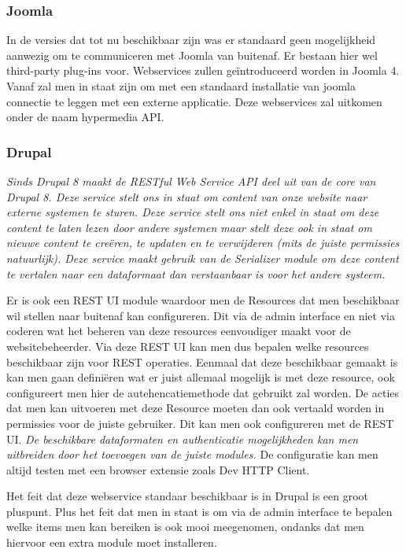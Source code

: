 \subsubsection{Joomla}
In de versies dat tot nu beschikbaar zijn was er standaard geen mogelijkheid aanwezig om te communiceren met Joomla van buitenaf. Er bestaan hier wel third-party plug-ins voor. Webservices zullen geïntroduceerd worden in Joomla 4. Vanaf zal men in staat zijn om met een standaard installatie van joomla connectie te leggen met een externe applicatie. Deze webservices zal uitkomen onder de naam hypermedia API.
\subsubsection{Drupal}
\textit{Sinds Drupal 8 maakt de RESTful Web Service API deel uit van de core van Drupal 8. Deze service stelt ons in staat om content van onze website naar externe systemen te sturen. Deze service stelt ons niet enkel in staat om deze content te laten lezen door andere systemen maar stelt deze ook in staat om nieuwe content te creëren, te updaten en te verwijderen (mits de juiste permissies natuurlijk). Deze service maakt gebruik van de Serializer module om deze content te vertalen naar een dataformaat dan verstaanbaar is voor het andere systeem.}\autocite{DrupalCommunity2018b}

Er is ook een REST UI module waardoor men de Resources dat men beschikbaar wil stellen naar buitenaf kan configureren. Dit via de admin interface en niet via coderen wat het beheren van deze resources eenvoudiger maakt voor de websitebeheerder. Via deze REST UI kan men dus bepalen welke resources beschikbaar zijn voor REST operaties. Eenmaal dat deze beschikbaar gemaakt is kan men gaan definiëren wat er juist allemaal mogelijk is met deze resource, ook configureert men hier de autehencatiemethode dat gebruikt zal worden. De acties dat men kan uitvoeren met deze Resource moeten dan ook vertaald worden in permissies voor de juiste gebruiker. Dit kan men ook configureren met de REST UI. \textit{De beschikbare dataformaten en authenticatie mogelijkheden kan men uitbreiden door het toevoegen van de juiste modules. }\autocite{DrupalCommunity2018b} De configuratie kan men altijd testen met een browser extensie zoals Dev HTTP Client.

Het feit dat deze webservice standaar beschikbaar is in Drupal is een groot pluspunt. Plus het feit dat men in staat is om via de admin interface te bepalen welke items men kan bereiken is ook mooi meegenomen, ondanks dat men hiervoor een extra module moet installeren. 
